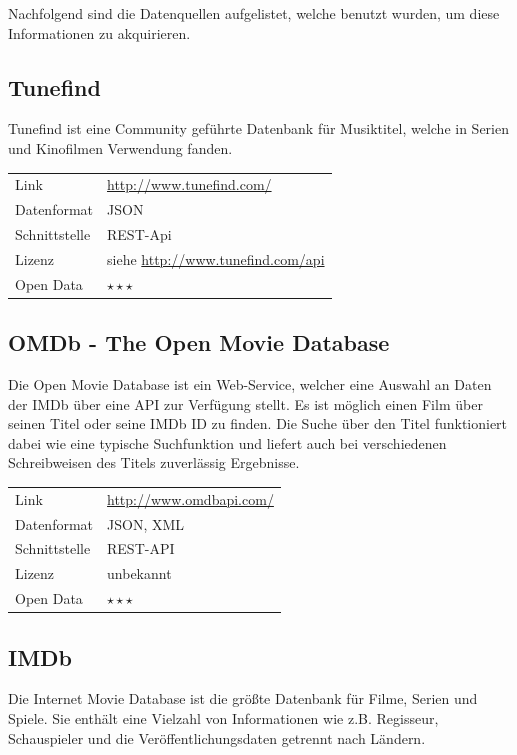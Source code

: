\documentclass[parskip]{scrartcl}
\begin{document}
Nachfolgend sind die Datenquellen aufgelistet, welche benutzt wurden, um diese Informationen zu akquirieren.

\subsection{Tunefind}
\label{subsec:tunefind}

Tunefind ist eine Community geführte Datenbank für Musiktitel, welche in Serien und Kinofilmen Verwendung fanden.

\begin{tabular}{l|p{9cm}}
	Link & \url{http://www.tunefind.com/} \\
 	Datenformat & JSON \\
 	Schnittstelle & REST-Api \\
 	Lizenz & siehe \url{http://www.tunefind.com/api} \\
 	Open Data & $\star\star\star$ \\
\end{tabular}

\subsection{OMDb - The Open Movie Database}

Die Open Movie Database ist ein Web-Service, welcher eine Auswahl an Daten der IMDb über eine API zur Verfügung stellt. Es ist möglich einen Film über seinen  Titel oder seine IMDb ID zu finden. Die Suche über den Titel funktioniert dabei wie eine typische Suchfunktion und liefert auch bei verschiedenen Schreibweisen des Titels zuverlässig Ergebnisse.

\begin{tabular}{l|p{9cm}}
    Link & \url{http://www.omdbapi.com/} \\
    Datenformat & JSON, XML \\
    Schnittstelle & REST-API \\
    Lizenz & unbekannt \\
    Open Data & $\star\star\star$ \\
\end{tabular}

\subsection{IMDb}

Die Internet Movie Database ist die größte Datenbank für Filme, Serien und Spiele. Sie enthält eine Vielzahl von Informationen wie z.B. Regisseur, Schauspieler und die Veröffentlichungsdaten getrennt nach Ländern.
\end{document}
